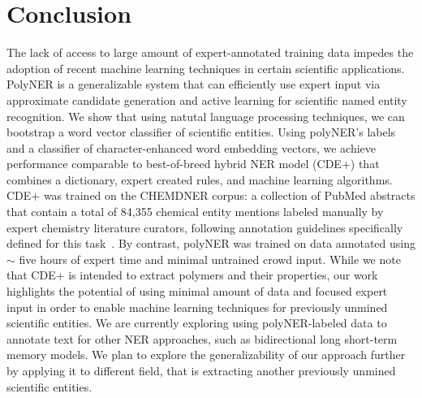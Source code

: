\section{Conclusion}
\label{sect:apner_conclusion}
The lack of access to large amount of expert-annotated training data impedes the adoption of recent machine learning techniques in certain scientific applications.
PolyNER is a generalizable system that can efficiently use expert input via approximate candidate generation and active learning for scientific named entity recognition.
We show that using natutal language processing techniques, we can bootstrap a word vector classifier of scientific entities.
Using polyNER's labels and a classifier of character-enhanced word embedding vectors, we achieve 
performance comparable to best-of-breed
hybrid NER model (CDE+) that combines a dictionary, expert created
rules, and machine learning algorithms.
CDE+ was trained on the CHEMDNER corpus:
a collection of  PubMed abstracts that contain a total of 84,355 chemical entity mentions labeled manually by expert chemistry literature curators, following annotation guidelines specifically defined for this task~\cite{krallinger2015chemdner}. 
By contrast, polyNER was trained on data annotated using $\sim$ five hours of expert time and minimal untrained crowd input.
While we note that CDE+ is intended to extract polymers and their properties, our work highlights the potential of using minimal amount of data and focused expert input in order to enable machine learning techniques for previously unmined scientific entities. 
We are currently exploring using polyNER-labeled data to annotate text for other NER approaches,
such as bidirectional long short-term memory models.
We plan to explore the generalizability of our approach further by applying it to different field, that is extracting another previously unmined scientific entities.
